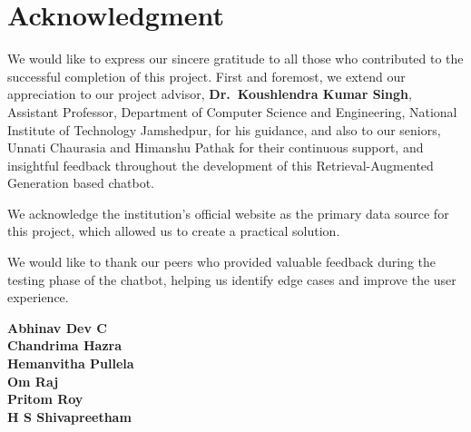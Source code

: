 \chapter*{\huge Acknowledgment}

\noindent
We would like to express our sincere gratitude to all those who contributed to the successful completion of this project. First and foremost, we extend our appreciation to our project advisor, \textbf{Dr.\ Koushlendra Kumar Singh}, Assistant Professor, Department of Computer Science and Engineering, National Institute of Technology Jamshedpur, for his guidance, and also to our seniors, Unnati Chaurasia and Himanshu Pathak  for their continuous support, and insightful feedback throughout the development of this Retrieval-Augmented Generation based chatbot.

We acknowledge the institution's official website as the primary data source for this project, which allowed us to create a practical solution.

We would like to thank our peers who provided valuable feedback during the testing phase of the chatbot, helping us identify edge cases and improve the user experience.

\vspace{0.5in}

\begin{flushright}
\textbf{Abhinav Dev C}\\
\textbf{Chandrima Hazra}\\
\textbf{Hemanvitha Pullela}\\
\textbf{Om Raj}\\
\textbf{Pritom Roy}\\
\textbf{H S Shivapreetham}
\end{flushright}
